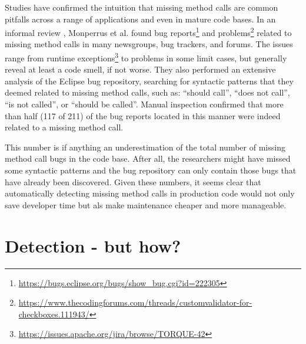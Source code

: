 Studies have confirmed the intuition that missing method calls are common pitfalls across a range of applications and even in mature code bases.
In an informal review \cite{monperrus2010detecting}, Monperrus et al. found bug reports\footnote{\url{https://bugs.eclipse.org/bugs/show_bug.cgi?id=222305}} and problems\footnote{\url{https://www.thecodingforums.com/threads/customvalidator-for-checkboxes.111943/}} related to missing method calls in many newsgroups, bug trackers, and forums.
The issues range from runtime exceptions\footnote{\url{https://issues.apache.org/jira/browse/TORQUE-42}} to problems in some limit cases, but generally reveal at least a code smell, if not worse.
They also performed an extensive analysis \cite{monperrus2013detecting} of the Eclipse bug repository,
searching for syntactic patterns that they deemed related to missing method calls, such as: ``should call'', ``does not call'', ``is not called'', or ``should be called''.
Manual inspection confirmed that more than half (117 of 211) of the bug reports located in this manner were indeed related to a missing method call.

This number is if anything an underestimation of the total number of missing method call bugs in the code base.
After all, the researchers might have missed some syntactic patterns and the bug repository can only contain those bugs that have already been discovered.
Given these numbers, it seems clear that automatically detecting missing method calls in production code would not only save developer time but als make maintenance cheaper and more manageable.

\section{Detection - but how?}

